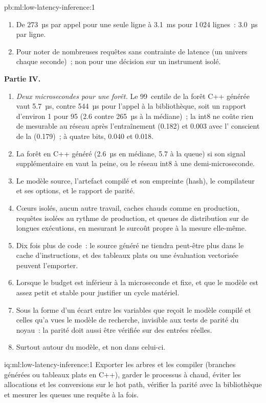\begin{solution}{pb:ml:low-latency-inference:1}
\begin{enumerate}[resume]
\item De 273~µs par appel pour une seule ligne à 3.1~ms pour 1\,024 lignes~: 3.0~µs par ligne.
\item Pour noter de nombreuses requêtes sans contrainte de latence (un univers chaque seconde)~; non pour une décision sur un instrument isolé.
\end{enumerate}
\textbf{Partie IV.}
\begin{enumerate}[resume]
\item \emph{Deux microsecondes pour une forêt.} Le 99~centile de la forêt C++ générée vaut 5.7~µs, contre 544~µs pour
l'appel à la bibliothèque, soit un rapport d'environ 1 pour 95 (2.6 contre 265~µs à la médiane)~; la  int8 ne coûte rien de mesurable au réseau après
l'entraînement (0.182) et 0.003 avec l' conscient de la  (0.179)~; à quatre bits, 0.040 et 0.018.
\item La forêt en C++ généré (2.6~µs en médiane, 5.7 à la queue) si son signal supplémentaire en vaut la peine, ou le réseau int8
à une demi-microseconde.
\item Le modèle source, l'artefact compilé et son empreinte (hash), le compilateur et ses options, et le rapport de parité.
\item Cœurs isolés, aucun autre travail, caches chauds comme en production, requêtes isolées au rythme de production, et queues de distribution sur de longues
exécutions, en mesurant le surcoût propre à la mesure elle-même.
\item Dix fois plus de code~: le source généré ne tiendra peut-être plus dans le cache d'instructions, et des tableaux plats ou une évaluation
vectorisée peuvent l'emporter.
\item Lorsque le budget est inférieur à la microseconde et fixe, et que le modèle est assez petit et stable pour justifier un cycle matériel.
\item Sous la forme d'un écart entre les variables que reçoit le modèle compilé et celles qu'a vues le modèle de recherche, invisible aux
tests de parité du noyau~: la parité doit aussi être vérifiée sur des entrées réelles.
\item Surtout autour du modèle, et non dans celui-ci.
\end{enumerate}
\end{solution}

\begin{solution}{iq:ml:low-latency-inference:1}
Exporter les arbres et les compiler (branches générées ou tableaux plats en C++), garder le processus à chaud, éviter les allocations et
les conversions sur le hot path, vérifier la parité avec la bibliothèque et mesurer les queues une requête à la fois.
\end{solution}

